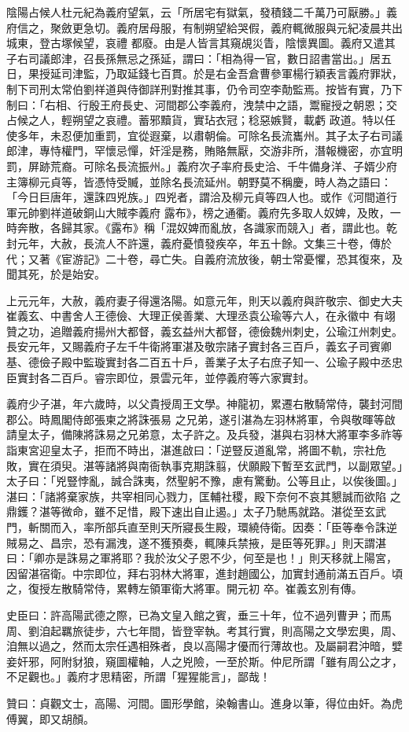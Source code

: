 \begin{pinyinscope}
 陰陽占候人杜元紀為義府望氣，云「所居宅有獄氣，發積錢二千萬乃可厭勝。」義府信之，聚斂更急切。義府居母服，有制朔望給哭假，義府輒微服與元紀凌晨共出城東，登古塚候望，哀禮
 都廢。由是人皆言其窺覘災眚，陰懷異圖。義府又遣其子右司議郎津，召長孫無忌之孫延，謂曰：「相為得一官，數日詔書當出。」居五日，果授延司津監，乃取延錢七百貫。於是右金吾倉曹參軍楊行穎表言義府罪狀，制下司刑太常伯劉祥道與侍御詳刑對推其事，仍令司空李勣監焉。按皆有實，乃下制曰：「右相、行殷王府長史、河間郡公李義府，洩禁中之語，鬻寵授之朝恩；交占候之人，輕朔望之哀禮。蓄邪黷貨，實玷衣冠；稔惡嫉賢，載虧
 政道。特以任使多年，未忍便加重罰，宜從遐棄，以肅朝倫。可除名長流巂州。其子太子右司議郎津，專恃權門，罕懷忌憚，奸淫是務，賄賂無厭，交游非所，潛報機密，亦宜明罰，屏跡荒裔。可除名長流振州。」義府次子率府長史洽、千牛備身洋、子婿少府主簿柳元貞等，皆憑恃受贓，並除名長流延州。朝野莫不稱慶，時人為之語曰：「今日巨唐年，還誅四兇族。」四兇者，謂洽及柳元貞等四人也。或作《河間道行軍元帥劉祥道破銅山大賊李義府
 露布》，榜之通衢。義府先多取人奴婢，及敗，一時奔散，各歸其家。《露布》稱「混奴婢而亂放，各識家而競入」者，謂此也。乾封元年，大赦，長流人不許還，義府憂憤發疾卒，年五十餘。文集三十卷，傳於代；又著《宦游記》二十卷，尋亡失。自義府流放後，朝士常憂懼，恐其復來，及聞其死，於是始安。



 上元元年，大赦，義府妻子得還洛陽。如意元年，則天以義府與許敬宗、御史大夫崔義玄、中書舍人王德儉、大理正侯善業、大理丞袁公瑜等六人，在永徽中
 有翊贊之功，追贈義府揚州大都督，義玄益州大都督，德儉魏州刺史，公瑜江州刺史。長安元年，又賜義府子左千牛衛將軍湛及敬宗諸子實封各三百戶，義玄子司賓卿基、德儉子殿中監璇實封各二百五十戶，善業子太子右庶子知一、公瑜子殿中丞忠臣實封各二百戶。睿宗即位，景雲元年，並停義府等六家實封。



 義府少子湛，年六歲時，以父貴授周王文學。神龍初，累遷右散騎常侍，襲封河間郡公。時鳳閣侍郎張柬之將誅張易
 之兄弟，遂引湛為左羽林將軍，令與敬暉等啟請皇太子，備陳將誅易之兄弟意，太子許之。及兵發，湛與右羽林大將軍李多祚等詣東宮迎皇太子，拒而不時出，湛進啟曰：「逆豎反道亂常，將圖不軌，宗社危敗，實在須臾。湛等諸將與南衙執事克期誅翦，伏願殿下暫至玄武門，以副眾望。」太子曰：「兇豎悖亂，誠合誅夷，然聖躬不豫，慮有驚動。公等且止，以俟後圖。」湛曰：「諸將棄家族，共宰相同心戮力，匡輔社稷，殿下奈何不哀其懇誠而欲陷
 之鼎鑊？湛等微命，雖不足惜，殿下速出自止遏。」太子乃馳馬就路。湛從至玄武門，斬關而入，率所部兵直至則天所寢長生殿，環繞侍衛。因奏：「臣等奉令誅逆賊易之、昌宗，恐有漏洩，遂不獲預奏，輒陳兵禁掖，是臣等死罪。」則天謂湛曰：「卿亦是誅易之軍將耶？我於汝父子恩不少，何至是也！」則天移就上陽宮，因留湛宿衛。中宗即位，拜右羽林大將軍，進封趙國公，加實封通前滿五百戶。頃之，復授左散騎常侍，累轉左領軍衛大將軍。開元初
 卒。崔義玄別有傳。



 史臣曰：許高陽武德之際，已為文皇入館之賓，垂三十年，位不過列曹尹；而馬周、劉洎起羈旅徒步，六七年間，皆登宰執。考其行實，則高陽之文學宏奧，周、洎無以過之，然而太宗任遇相殊者，良以高陽才優而行薄故也。及屬嗣君沖暗，嬖妾奸邪，阿附豺狼，窺圖權軸，人之兇險，一至於斯。仲尼所謂「雖有周公之才，不足觀也。」義府才思精密，所謂「猩猩能言」，鄙哉！



 贊曰：貞觀文士，高陽、河間。圖形學館，染翰書山。進身以筆，得位由奸。為虎傅翼，即又胡顏。



\end{pinyinscope}